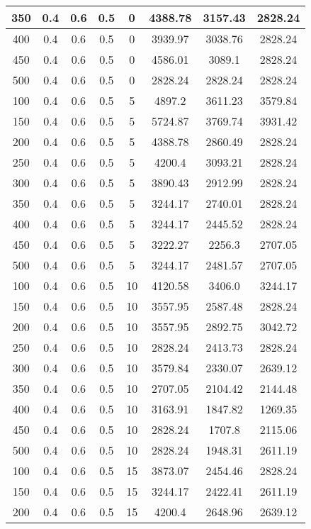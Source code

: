 \documentclass[a4paper, 12pt]{extreport}
\begin{document}
\begin{itemize}
\begin{longtable}{|c|c|c|c|c|c|c|c|}
			350 & 0.4 & 0.6 & 0.5 & 0 & 4388.78 & 3157.43 & 2828.24 \\\hline
			400 & 0.4 & 0.6 & 0.5 & 0 & 3939.97 & 3038.76 & 2828.24 \\\hline
			450 & 0.4 & 0.6 & 0.5 & 0 & 4586.01 & 3089.1 & 2828.24 \\\hline
			500 & 0.4 & 0.6 & 0.5 & 0 & 2828.24 & 2828.24 & 2828.24 \\\hline
			100 & 0.4 & 0.6 & 0.5 & 5 & 4897.2 & 3611.23 & 3579.84 \\\hline
			150 & 0.4 & 0.6 & 0.5 & 5 & 5724.87 & 3769.74 & 3931.42 \\\hline
			200 & 0.4 & 0.6 & 0.5 & 5 & 4388.78 & 2860.49 & 2828.24 \\\hline
			250 & 0.4 & 0.6 & 0.5 & 5 & 4200.4 & 3093.21 & 2828.24 \\\hline
			300 & 0.4 & 0.6 & 0.5 & 5 & 3890.43 & 2912.99 & 2828.24 \\\hline
			350 & 0.4 & 0.6 & 0.5 & 5 & 3244.17 & 2740.01 & 2828.24 \\\hline
			400 & 0.4 & 0.6 & 0.5 & 5 & 3244.17 & 2445.52 & 2828.24 \\\hline
			450 & 0.4 & 0.6 & 0.5 & 5 & 3222.27 & 2256.3 & 2707.05 \\\hline
			500 & 0.4 & 0.6 & 0.5 & 5 & 3244.17 & 2481.57 & 2707.05 \\\hline
			100 & 0.4 & 0.6 & 0.5 & 10 & 4120.58 & 3406.0 & 3244.17 \\\hline
			150 & 0.4 & 0.6 & 0.5 & 10 & 3557.95 & 2587.48 & 2828.24 \\\hline
			200 & 0.4 & 0.6 & 0.5 & 10 & 3557.95 & 2892.75 & 3042.72 \\\hline
			250 & 0.4 & 0.6 & 0.5 & 10 & 2828.24 & 2413.73 & 2828.24 \\\hline
			300 & 0.4 & 0.6 & 0.5 & 10 & 3579.84 & 2330.07 & 2639.12 \\\hline
			350 & 0.4 & 0.6 & 0.5 & 10 & 2707.05 & 2104.42 & 2144.48 \\\hline
			400 & 0.4 & 0.6 & 0.5 & 10 & 3163.91 & 1847.82 & 1269.35 \\\hline
			450 & 0.4 & 0.6 & 0.5 & 10 & 2828.24 & 1707.8 & 2115.06 \\\hline
			500 & 0.4 & 0.6 & 0.5 & 10 & 2828.24 & 1948.31 & 2611.19 \\\hline
			100 & 0.4 & 0.6 & 0.5 & 15 & 3873.07 & 2454.46 & 2828.24 \\\hline
			150 & 0.4 & 0.6 & 0.5 & 15 & 3244.17 & 2422.41 & 2611.19 \\\hline
			200 & 0.4 & 0.6 & 0.5 & 15 & 4200.4 & 2648.96 & 2639.12 \\\hline

\end{longtable}
\end{itemize}
\end{document}
